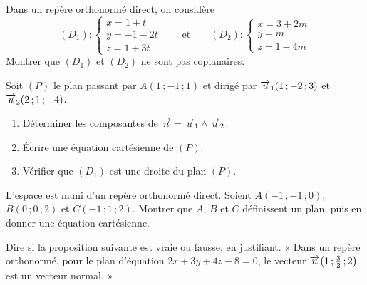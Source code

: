 \begin{annales}
Dans un repère orthonormé direct, on considère
\[
  (D_{1}) : \begin{cases} x = 1+t \\ y = -1-2t \\ z = 1+3t \end{cases}
  \qquad\text{et}\qquad
  (D_{2}) : \begin{cases} x = 3+2m \\ y = m \\ z = 1-4m \end{cases}
\]
Montrer que $(D_{1})$ et $(D_{2})$ ne sont pas coplanaires.

Soit $(P)$ le plan passant par $A(1\,;-1\,;1)$ et dirigé par
$\overrightarrow{u}_{1}(1\,;-2\,;3)$ et $\overrightarrow{u}_{2}(2\,;1\,;-4)$.
\begin{enumerate}[label=\textbf{\alph*)}, leftmargin=*, itemsep=0.15em]
  \item Déterminer les composantes de $\overrightarrow{n} = \overrightarrow{u}_{1} \wedge \overrightarrow{u}_{2}$.
  \item Écrire une équation cartésienne de $(P)$.
  \item Vérifier que $(D_{1})$ est une droite du plan $(P)$.
\end{enumerate}

L'espace est muni d'un repère orthonormé direct. Soient $A(-1\,;-1\,;0)$,
$B(0\,;0\,;2)$ et $C(-1\,;1\,;2)$. Montrer que $A$, $B$ et $C$ définissent un
plan, puis en donner une équation cartésienne.

Dire si la proposition suivante est vraie ou fausse, en justifiant.
« Dans un repère orthonormé, pour le plan d'équation $2x+3y+4z-8 = 0$, le
vecteur $\overrightarrow{n}\!\left(1\,;\frac32\,;2\right)$ est un vecteur normal. »
\end{annales}

